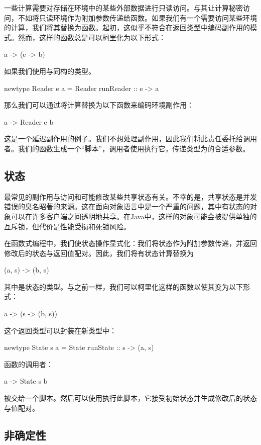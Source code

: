 \documentclass[DaoFP]{subfiles}
\begin{document}
一些计算需要对存储在环境中的某些外部数据进行只读访问。与其让计算秘密访问，不如将只读环境作为附加参数传递给函数。如果我们有一个需要访问某些环境的计算，我们将其替换为函数。起初，这似乎不符合在返回类型中编码副作用的模式。然而，这样的函数总是可以柯里化为以下形式：
\begin{haskell}
a -> (e -> b)
\end{haskell}
如果我们使用与同构的类型。
\begin{haskell}
newtype Reader e a = Reader { runReader :: e -> a }
\end{haskell}
那么我们可以通过将计算替换为以下函数来编码环境副作用：
\begin{haskell}
a -> Reader e b
\end{haskell}
这是一个延迟副作用的例子。我们不想处理副作用，因此我们将此责任委托给调用者。我们的函数生成一个“脚本”，调用者使用执行它，传递类型为的合适参数。

\subsection{状态}

最常见的副作用与访问和可能修改某些共享状态有关。不幸的是，共享状态是并发错误的臭名昭著的来源。这在面向对象语言中是一个严重的问题，其中有状态的对象可以在许多客户端之间透明地共享。在Java中，这样的对象可能会被提供单独的互斥锁，但代价是性能受损和死锁风险。

在函数式编程中，我们使状态操作显式化：我们将状态作为附加参数传递，并返回修改后的状态与返回值配对。因此，我们将有状态计算替换为
\begin{haskell}
(a, s) -> (b, s)
\end{haskell}
其中是状态的类型。与之前一样，我们可以柯里化这样的函数以使其变为以下形式：
\begin{haskell}
a -> (s -> (b, s))
\end{haskell}
这个返回类型可以封装在新类型中：
\begin{haskell}
newtype State s a = State { runState :: s -> (a, s) }
\end{haskell}
函数的调用者：
\begin{haskell}
a -> State s b
\end{haskell}
被交给一个脚本。然后可以使用执行此脚本，它接受初始状态并生成修改后的状态与值配对。

\subsection{非确定性}
\end{document}
